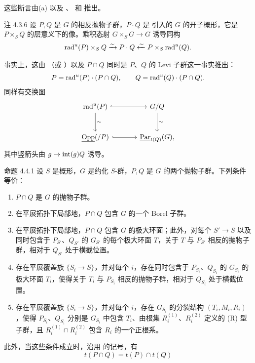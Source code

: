 这些断言由\textup{(a)} 以及 、 和  推出。

\begin{sgastatement}{注 4.3.6}
设 \(P,Q\) 是 \(G\) 的相反抛物子群，\(P\cdot Q\) 是  引入的 \(G\) 的开子概形，它是 \(P\times_SQ\) 的层意义下的像。乘积态射 \(G\times_SG\to G\) 诱导同构
\[
 \operatorname{rad}^u(P)\times_SQ
 \xrightarrow{\sim}P\cdot Q
 \xleftarrow{\sim}P\times_S\operatorname{rad}^u(Q).
\]
\end{sgastatement}

事实上，这由 （或 \textup{}）以及 \(P\cap Q\) 同时是 \(P\)、\(Q\) 的 Levi 子群这一事实推出：
\[
 P=\operatorname{rad}^u(P)\cdot(P\cap Q),\qquad
 Q=\operatorname{rad}^u(Q)\cdot(P\cap Q).
\]
同样有交换图
\[
\begin{tikzcd}[column sep=large,row sep=large]
 \rad^u(P) \arrow[r,hook] \arrow[d,"\sim"] & G/Q\arrow[d,"\sim"]\\
 \Opp(/P) \arrow[r,hook] & \Par_{t(Q)}(G),
\end{tikzcd}
\]
其中竖箭头由 \(g\mapsto\operatorname{int}(g)Q\) 诱导。

\begin{sgastatement}{命题 4.4.1}
设 \(S\) 是概形，\(G\) 是约化 \(S\)-群，\(P,Q\) 是 \(G\) 的两个抛物子群。下列条件等价：
\begin{enumerate}[label=\textup{(\roman*)}]
\item \(P\cap Q\) 是 \(G\) 的抛物子群。
\item 在平展拓扑下局部地，\(P\cap Q\) 包含 \(G\) 的一个 Borel 子群。
\item 在平展拓扑下局部地，\(P\cap Q\) 包含 \(G\) 的极大环面；此外，对每个 \(S'\to S\) 以及同时包含于 \(P_{S'}\)、\(Q_{S'}\) 的 \(G_{S'}\) 的每个极大环面 \(T\)，关于 \(T\) 与 \(P_{S'}\) 相反的抛物子群，相对于 \(Q_{S'}\) 处于横截位置。
\item 存在平展覆盖族 \(\{S_i\to S\}\)，并对每个 \(i\)，存在同时包含于 \(P_{S_i}\)、\(Q_{S_i}\) 的 \(G_{S_i}\) 的极大环面 \(T_i\)，使得关于 \(T_i\) 与 \(P_{S_i}\) 相反的抛物子群，相对于 \(Q_{S_i}\) 处于横截位置。
\item 存在平展覆盖族 \(\{S_i\to S\}\)，并对每个 \(i\)，存在 \(G_{S_i}\) 的分裂结构 \((T_i,M_i,R_i)\)，使得 \(P_{S_i}\)、\(Q_{S_i}\) 分别是 \(G_{S_i}\) 中包含 \(T_i\)、由根集 \(R_i^{(1)}\)、\(R_i^{(2)}\) 定义的 \textup{(R)} 型子群，且 \(R_i^{(1)}\cap R_i^{(2)}\) 包含 \(R_i\) 的一个正根系。
\end{enumerate}
此外，当这些条件成立时，沿用  的记号，有
\[
 t(P\cap Q)=t(P)\cap t(Q)
\]
\end{sgastatement}


